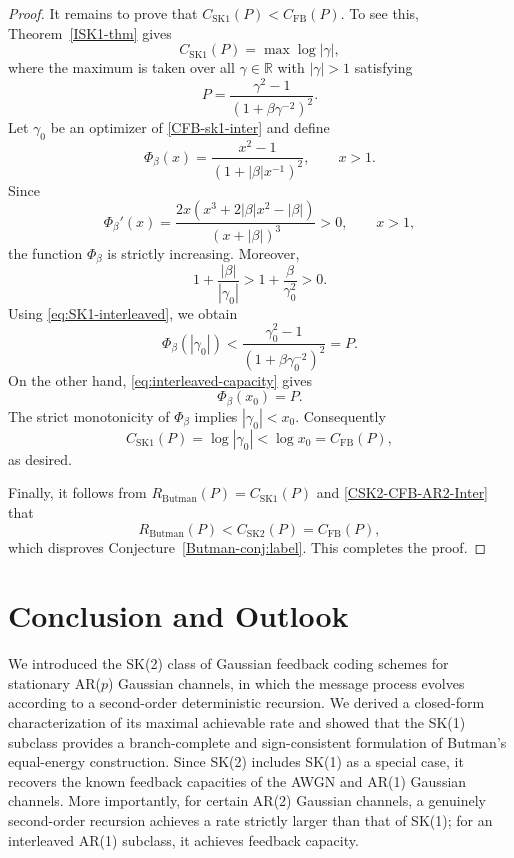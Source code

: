 \documentclass[12pt]{article}
\begin{document}
\begin{proof}
It remains to prove that $C_{\mathrm{SK1}}(P)<C_{\mathrm{FB}}(P)$. To see this, Theorem~\ref{ISK1-thm} gives
\begin{equation}\label{CFB-sk1-inter}
C_\mathrm{SK1}(P)=\max\log |\gamma|,
\end{equation}
where the maximum is taken over all $\gamma\in\mathbb{R}$ with $|\gamma|>1$ satisfying 
\begin{equation}\label{eq:SK1-interleaved}
P= \frac{\gamma^2-1} {\left(1+\beta \gamma^{-2}\right)^2}.
\end{equation}
Let $\gamma_0$ be an optimizer of \eqref{CFB-sk1-inter} and define
$$
\Phi_\beta(x) = \frac{x^2-1}{\left(1+|\beta| x^{-1}\right)^2}, \qquad x>1.
$$
Since
$$
\Phi_\beta'(x) = \frac{2x\left(x^3+2|\beta| x^2-|\beta|\right)} {(x+|\beta|)^3} >0, \qquad x>1,
$$
the function $\Phi_\beta$ is strictly increasing. Moreover, 
$$
1+\frac{|\beta|}{|\gamma_0|} > 1+\frac{\beta}{\gamma_0^2} >0.
$$
Using \eqref{eq:SK1-interleaved}, we obtain
$$
\Phi_\beta(|\gamma_0|) < \frac{\gamma_0^2-1} {\left(1+\beta \gamma_0^{-2}\right)^2} = P.
$$
On the other hand, \eqref{eq:interleaved-capacity} gives
$$
\Phi_\beta(x_0)=P.
$$
The strict monotonicity of $\Phi_\beta$ implies $|\gamma_0|<x_0$. Consequently
$$
C_{\mathrm{SK1}}(P) = \log |\gamma_0| < \log x_0 = C_{\mathrm{FB}}(P),
$$
as desired.

Finally, it follows from $R_{\mathrm{Butman}}(P) = C_{\mathrm{SK1}}(P)$ and \eqref{CSK2-CFB-AR2-Inter} that 
$$
R_{\mathrm{Butman}}(P) < C_{\mathrm{SK2}}(P) = C_{\mathrm{FB}}(P),
$$
which disproves Conjecture~\ref{Butman-conj:label}. This completes the proof. 
\end{proof}


\section{Conclusion and Outlook}

We introduced the SK(2) class of Gaussian feedback coding schemes for stationary AR($p$) Gaussian channels, in which the message process evolves according to a second-order deterministic recursion. We derived a closed-form characterization of its maximal achievable rate and showed that the SK(1) subclass provides a branch-complete and sign-consistent formulation of Butman's equal-energy construction. Since SK(2) includes SK(1) as a special case, it recovers the known feedback capacities of the AWGN and AR(1) Gaussian channels. More importantly, for certain AR(2) Gaussian channels, a genuinely second-order recursion achieves a rate strictly larger than that of SK(1); for an interleaved AR(1) subclass, it achieves feedback capacity.
\end{document}
